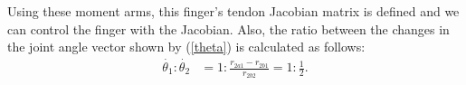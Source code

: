 \documentclass{llncs}
\begin{document}



Using these moment arms, this finger's tendon Jacobian matrix is defined and we can control the finger with the Jacobian.
Also, the ratio between the changes in the joint angle vector shown by (\ref{theta}) is calculated as follows:
		\begin{align}
			\dot{\theta_1} : \dot{\theta_2} & = 1 : \frac{r_{2a1}-r_{2b1}}{r_{2b2}} %
			= 1 : \frac{1}{2}. \nonumber
		\end{align}

		


\end{document}
